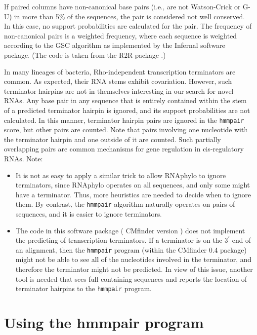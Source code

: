 \documentclass[letterpaper,12pt]{report}
\begin{document}
If paired columns have non-canonical base pairs (i.e., are not Watson-Crick or G-U) in more than 5\% of the sequences, the pair is considered not well conserved. In this case, no support probabilities are calculated for the pair. The frequency of non-canonical pairs is a weighted frequency, where each sequence is weighted according to the GSC algorithm as implemented by the Infernal software package.  (The code is taken from the R2R package \cite{RtoR}.)

In many lineages of bacteria, Rho-independent transcription terminators are common. As expected, their RNA stems exhibit covariation. However, such terminator hairpins are not in themselves interesting in our search for novel RNAs. Any base pair in any sequence that is entirely contained within the stem of a predicted terminator hairpin is ignored, and its support probabilities are not calculated. In this manner, terminator hairpin pairs are ignored in the {\tt hmmpair} score, but other pairs are counted. Note that pairs involving one nucleotide with the terminator hairpin and one outside of it are counted. Such partially overlapping pairs are common mechanisms for gene regulation in cis-regulatory RNAs.
Note:
\begin{itemize}
\item It is not as easy to apply a similar trick to allow RNAphylo to ignore terminators, since RNAphylo operates on all sequences, and only some might have a terminator. Thus, more heuristics are needed to decide when to ignore them. By contrast, the {\tt hmmpair} algorithm naturally operates on pairs of sequences, and it is easier to ignore terminators.
\item The code in this software package ( CMfinder version \myversion{}) does not implement the predicting of transcription terminators. If a terminator is on the $3^\prime$ end of an alignment, then the {\tt hmmpair} program (within the CMfinder 0.4 package) might not be able to see all of the nucleotides involved in the terminator, and therefore the terminator might not be predicted. In view of this issue, another tool is needed that sees full containing sequences and reports the location of terminator hairpins to the {\tt hmmpair} program.
\end{itemize}

\section{Using the hmmpair program}
\label{sec:terminators}
\end{document}
